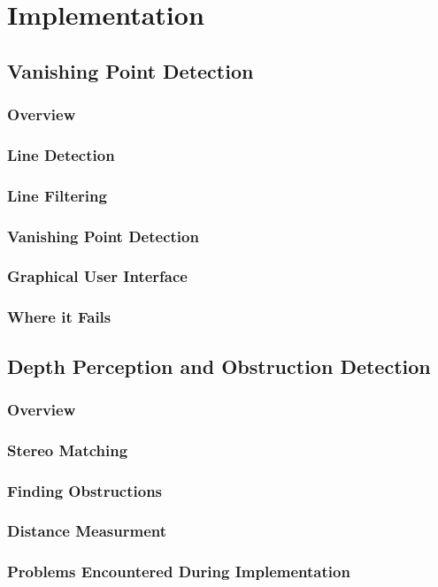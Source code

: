 \chapter{Implementation}
\label{chp:implementation}

\section{Vanishing Point Detection}

\subsection{Overview}

\subsection{Line Detection}

\subsection{Line Filtering}

\subsection{Vanishing Point Detection}

\subsection{Graphical User Interface}

\subsection{Where it Fails}

\section{Depth Perception and Obstruction Detection}

\subsection{Overview}

\subsection{Stereo Matching}

\subsection{Finding Obstructions}

\subsection{Distance Measurment}

\subsection{Problems Encountered During Implementation }